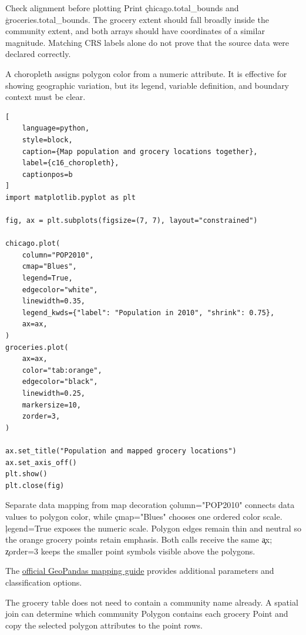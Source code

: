 \begin{TryBox}{Check alignment before plotting}
Print \c{chicago.total_bounds} and \c{groceries.total_bounds}. The grocery
extent should fall broadly inside the community extent, and both arrays should
have coordinates of a similar magnitude. Matching CRS labels alone do not
prove that the source data were declared correctly.
\end{TryBox}


A choropleth assigns polygon color from a numeric attribute. It is effective
for showing geographic variation, but its legend, variable definition, and
boundary context must be clear.

\begin{lstlisting}[
    language=python,
    style=block,
    caption={Map population and grocery locations together},
    label={c16_choropleth},
    captionpos=b
]
import matplotlib.pyplot as plt

fig, ax = plt.subplots(figsize=(7, 7), layout="constrained")

chicago.plot(
    column="POP2010",
    cmap="Blues",
    legend=True,
    edgecolor="white",
    linewidth=0.35,
    legend_kwds={"label": "Population in 2010", "shrink": 0.75},
    ax=ax,
)
groceries.plot(
    ax=ax,
    color="tab:orange",
    edgecolor="black",
    linewidth=0.25,
    markersize=10,
    zorder=3,
)

ax.set_title("Population and mapped grocery locations")
ax.set_axis_off()
plt.show()
plt.close(fig)
\end{lstlisting}

\begin{SyntaxBox}{Separate data mapping from map decoration}
\c{column="POP2010"} connects data values to polygon color, while
\c{cmap="Blues"} chooses one ordered color scale. \c{legend=True} exposes the
numeric scale. Polygon edges remain thin and neutral so the orange grocery
points retain emphasis. Both calls receive the same \c{ax}; \c{zorder=3} keeps
the smaller point symbols visible above the polygons.
\end{SyntaxBox}

The
\href{https://geopandas.org/en/stable/docs/user_guide/mapping.html}{official GeoPandas mapping guide}
provides additional parameters and classification options.


The grocery table does not need to contain a community name already. A spatial
join can determine which community Polygon contains each grocery Point and
copy the selected polygon attributes to the point rows.

